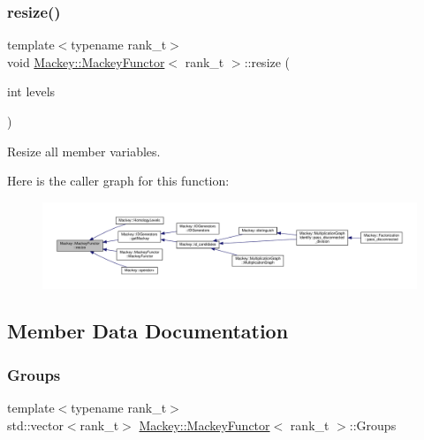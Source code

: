 \subsubsection{\texorpdfstring{resize()}{resize()}}
{\footnotesize\ttfamily template$<$typename rank\+\_\+t$>$ \\
void \hyperlink{classMackey_1_1MackeyFunctor}{Mackey\+::\+Mackey\+Functor}$<$ rank\+\_\+t $>$\+::resize (\begin{DoxyParamCaption}\item[{int}]{levels }\end{DoxyParamCaption})\hspace{0.3cm}{\ttfamily [inline]}}



Resize all member variables. 

Here is the caller graph for this function\+:\nopagebreak
\begin{figure}[H]
\begin{center}
\leavevmode
\includegraphics[width=350pt]{classMackey_1_1MackeyFunctor_a44d3104a47f23de5d8141b7800db6d11_icgraph}
\end{center}
\end{figure}


\subsection{Member Data Documentation}
\mbox{\label{classMackey_1_1MackeyFunctor_a4f8f5f7ac6267bdee2a67c8874bdd9a3}} 
\subsubsection{\texorpdfstring{Groups}{Groups}}
{\footnotesize\ttfamily template$<$typename rank\+\_\+t$>$ \\
std\+::vector$<$rank\+\_\+t$>$ \hyperlink{classMackey_1_1MackeyFunctor}{Mackey\+::\+Mackey\+Functor}$<$ rank\+\_\+t $>$\+::Groups}



